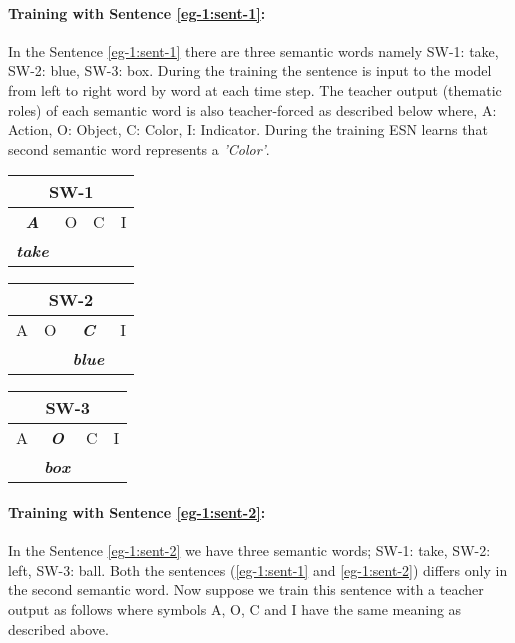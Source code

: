 \paragraph{Training with Sentence \ref{eg-1:sent-1}:} In the Sentence \ref{eg-1:sent-1} there are three semantic words namely SW-1: take, SW-2: blue, SW-3: box. During the training the sentence is input to the model from left to right word by word at each time step. The teacher output (thematic roles) of each semantic word is also teacher-forced as described below where, A: Action, O: Object, C: Color, I: Indicator. During the training ESN learns that second semantic word represents a \textit{'Color'}.

\begin{table}[hbtp]
\centering
\begin{minipage}{1.5in}
\begin{tabular}{|c|c|c|c|}
\hline
\multicolumn{4}{|c|}{\textbf{SW-1}}   \\ \hline
\textit{\textbf{A}}    & O & C & I 	\\ \hline
\textit{\textbf{take}} &   &   &  		\\  \hline
\end{tabular}
\end{minipage}
\begin{minipage}{1.5in}
\begin{tabular}{|c|c|c|c|}
\hline
\multicolumn{4}{|c|}{\textbf{SW-2}}                    \\ \hline
A	& O & \textit{\textbf{C}}    & I  \\ \hline
	&   & \textit{\textbf{blue}} & 	\\ \hline
\end{tabular}
\end{minipage}
\begin{minipage}{1.5in}
\begin{tabular}{|c|c|c|c|}
\hline
\multicolumn{4}{|c|}{\textbf{SW-3}}                                  \\ \hline
A	& \textit{\textbf{O}}   & C	& I \\ \hline
 	& \textit{\textbf{box}} &  	&   \\ \hline
\end{tabular}
\end{minipage}
\end{table}

\paragraph{Training with Sentence \ref{eg-1:sent-2}:} In the Sentence \ref{eg-1:sent-2} we have three semantic words; SW-1: take, SW-2: left, SW-3: ball. Both the sentences (\ref{eg-1:sent-1} and \ref{eg-1:sent-2}) differs only in the second semantic word. Now suppose we train this sentence with a teacher output as follows where symbols A, O, C and I have the same meaning as described above.

